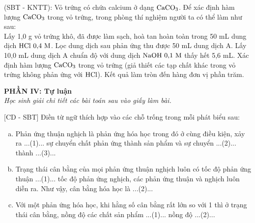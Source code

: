 \documentclass[12pt,a4paper]{article}
\begin{document}
\begin{ex}
(SBT - KNTT): Vỏ trứng có chứa calcium ở dạng $\ce{CaCO3}$. Để xác định hàm lượng $\ce{CaCO3}$ trong vỏ trứng, trong phòng thí nghiệm người ta có thể làm như sau:\\
Lấy 1,0 g vỏ trứng khô, đã được làm sạch, hoà tan hoàn toàn trong 50 mL dung dịch $\ce{HCl}\ 0{,}4\text{ M}$. Lọc dung dịch sau phản ứng thu được 50 mL dung dịch A. Lấy 10,0 mL dung dịch A chuẩn độ với dung dịch $\ce{NaOH}\ 0{,}1\text{ M}$ thấy hết 5,6 mL. Xác định hàm lượng $\ce{CaCO3}$ trong vỏ trứng (giả thiết các tạp chất khác trong vỏ trứng không phản ứng với $\ce{HCl}$). Kết quả làm tròn đến hàng đơn vị phần trăm.
\end{ex}

\bigskip
\noindent
\textbf{PHẦN IV: Tự luận}\\
\textit{Học sinh giải chi tiết các bài toán sau vào giấy làm bài.}

\begin{ex}
{[CD - SBT]} Điền từ ngữ thích hợp vào các chỗ trống trong mỗi phát biểu sau:
\begin{enumerate}[a)]
	\item Phản ứng thuận nghịch là phản ứng hóa học trong đó ở cùng điều kiện, xảy ra ...(1)... sự chuyển chất phản ứng thành sản phẩm và sự chuyển ...(2)... thành ...(3)...
	\item Trạng thái cân bằng của mọi phản ứng thuận nghịch luôn có tốc độ phản ứng thuận ...(1)... tốc độ phản ứng nghịch, các phản ứng thuận và nghịch luôn diễn ra. Như vậy, cân bằng hóa học là ...(2)...
	\item Với một phản ứng hóa học, khi hằng số cân bằng rất lớn so với 1 thì ở trạng thái cân bằng, nồng độ các chất sản phẩm ...(1)... nồng độ ...(2)...
\end{enumerate}
\end{ex}
\end{document}
